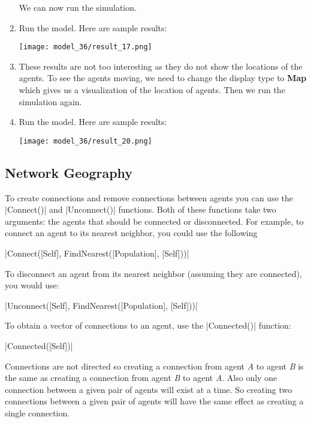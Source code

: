 \documentclass[]{memoir}
\makeatletter
\newcommand{\FunctionTok}[1]{\textcolor[rgb]{0.02,0.16,0.49}{{#1}}}
\newcommand{\NormalTok}[1]{{#1}}
\def\maxwidth{\ifdim\Gin@nat@width>\linewidth\linewidth
\else\Gin@nat@width\fi}
\let\Oldincludegraphics\includegraphics
\renewcommand{\includegraphics}[1]{\Oldincludegraphics[width=\maxwidth]{#1}}
\makeatother
\begin{document}
\begin{oframed}
\begin{enumerate}
We can now run the simulation.


\item Run the model. Here are sample results:\par \begin{minipage}{\linewidth}  \centering \texttt{[image: model\_36/result\_17.png]}
\end{minipage}
\item 

These results are not too interesting as they do not show the locations of the agents. To see the agents moving, we need to change the display type to \textbf{Map} which gives us a visualization of the location of agents. Then we run the simulation again.


\item Run the model. Here are sample results:\par \begin{minipage}{\linewidth}  \centering \texttt{[image: model\_36/result\_20.png]}
\end{minipage}

\end{enumerate} \end{oframed}

\subsection{Network Geography}

To create connections and remove connections between agents you can use
the |\FunctionTok{Connect}\NormalTok{()}| and
|\FunctionTok{Unconnect}\NormalTok{()}| functions. Both of these
functions take two arguments: the agents that should be connected or
disconnected. For example, to connect an agent to its nearest neighbor,
you could use the following

|\FunctionTok{Connect}\NormalTok{([Self], }\FunctionTok{FindNearest}\NormalTok{([Population], [Self]))}|

To disconnect an agent from its nearest neighbor (assuming they are
connected), you would use:

|\FunctionTok{Unconnect}\NormalTok{([Self], }\FunctionTok{FindNearest}\NormalTok{([Population], [Self]))}|

To obtain a vector of connections to an agent, use the
|\FunctionTok{Connected}\NormalTok{()}| function:

|\FunctionTok{Connected}\NormalTok{([Self])}|

Connections are not directed so creating a connection from agent
\emph{A} to agent \emph{B} is the same as creating a connection from
agent \emph{B} to agent \emph{A}. Also only one connection between a
given pair of agents will exist at a time. So creating two connections
between a given pair of agents will have the same effect as creating a
single connection.
\end{document}
